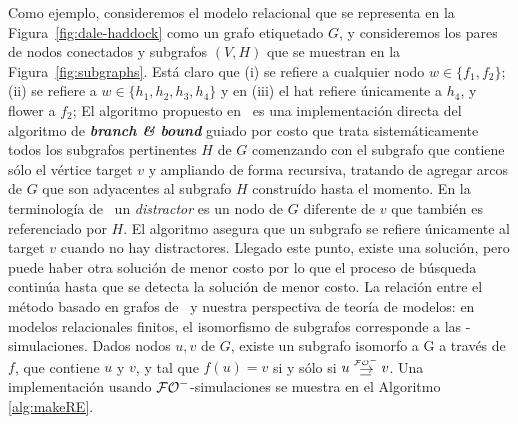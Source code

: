 Como ejemplo, consideremos el modelo relacional que se representa en la
Figura~\ref{fig:dale-haddock} como un grafo etiquetado $G$, y consideremos los pares de nodos conectados y subgrafos $(V, H)$ que se muestran en 
la Figura~\ref{fig:subgraphs}. Est\'a claro que (i) se refiere a cualquier nodo $w\in\{f_1,f_2\}$; (ii) se refiere a $w\in\{h_1,h_2,h_3,h_4\}$
y en (iii) el hat refiere \'unicamente a $h_4$, y flower a $f_2$; 
El algoritmo propuesto en~\cite{graph} es una
implementaci\'on directa del algoritmo de {\bf \emph{branch \& bound}} guiado por costo que trata sistem\'aticamente todos los
subgrafos pertinentes $H$ de $G$ comenzando con el subgrafo
que contiene s\'olo el v\'ertice target $v$ y ampliando de forma recursiva, tratando de
agregar arcos de $G$ que son adyacentes al subgrafo $H$ constru\'ido
hasta el momento. En la terminolog\'ia de~\cite{graph} un {\em distractor} es un nodo de $G$ diferente de
$v$ que tambi\'en es referenciado por $H$.
El algoritmo asegura que un subgrafo se refiere \'unicamente al target $v$ cuando no hay distractores. Llegado este punto, existe una
soluci\'on, pero puede haber otra
soluci\'on de menor costo por lo que el proceso de b\'usqueda contin\'ua hasta que
se detecta la soluci\'on de menor costo. 
La relaci\'on entre el m\'etodo basado en grafos
de~\cite{graph} y nuestra perspectiva de teor\'ia de modelos: en
modelos relacionales finitos, el isomorfismo de subgrafos corresponde a las
\EPFOL-simulaciones. Dados nodos $u,v$ de
$G$, existe un subgrafo isomorfo a G a trav\'es de $f$, que contiene $ u $ y
$v$, y tal que $f(u)=v$ si y s\'olo si $u \simul{\+\EPFOL} v$. Una implementaci\'on usando $\mathcal{{\mathcal{FO}^-}}$-simulaciones se muestra en el Algoritmo \ref{alg:makeRE}.
%
%


